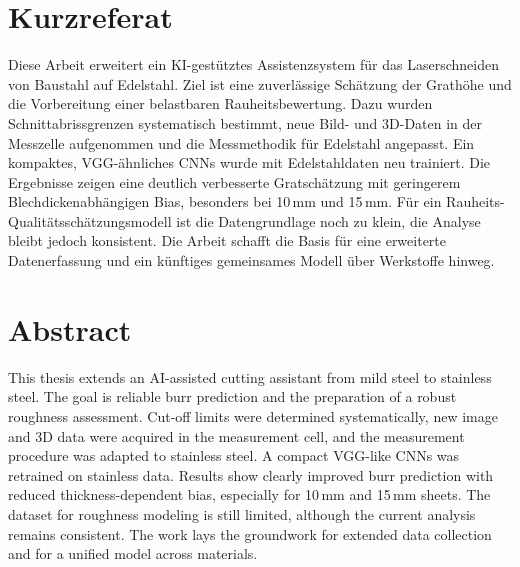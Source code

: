 \cleardoublepage
\thispagestyle{empty}   %
\pagestyle{empty}       %
\markboth{}{}           %
\begin{samepage}
\section*{Kurzreferat}

Diese Arbeit erweitert ein KI-gestütztes Assistenzsystem für das Laserschneiden von Baustahl auf Edelstahl. Ziel ist eine zuverlässige Schätzung der Grathöhe und die Vorbereitung einer belastbaren Rauheitsbewertung. Dazu wurden Schnittabrissgrenzen systematisch bestimmt, neue Bild- und 3D-Daten in der Messzelle aufgenommen und die Messmethodik für Edelstahl angepasst. Ein kompaktes, VGG-ähnliches \ac{CNNs} wurde mit Edelstahldaten neu trainiert. Die Ergebnisse zeigen eine deutlich verbesserte Gratschätzung mit geringerem Blechdickenabhängigen Bias, besonders bei 10\,mm und 15\,mm. Für ein Rauheits-Qualitätsschätzungsmodell ist die Datengrundlage noch zu klein, die Analyse bleibt jedoch konsistent. Die Arbeit schafft die Basis für eine erweiterte Datenerfassung und ein künftiges gemeinsames Modell über Werkstoffe hinweg.

\smallskip

\bigskip

\section*{Abstract}

This thesis extends an AI-assisted cutting assistant from mild steel to stainless steel. The goal is reliable burr prediction and the preparation of a robust roughness assessment. Cut-off limits were determined systematically, new image and 3D data were acquired in the measurement cell, and the measurement procedure was adapted to stainless steel. A compact VGG-like \ac{CNNs} was retrained on stainless data. Results show clearly improved burr prediction with reduced thickness-dependent bias, especially for 10\,mm and 15\,mm sheets. The dataset for roughness modeling is still limited, although the current analysis remains consistent. The work lays the groundwork for extended data collection and for a unified model across materials.

\smallskip
\end{samepage}


\newpage
